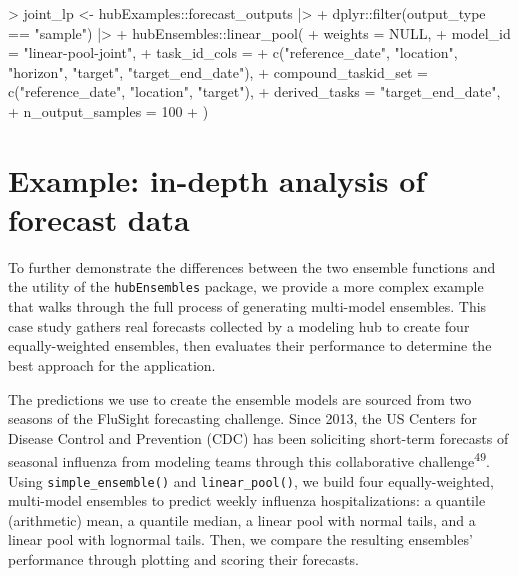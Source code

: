 \documentclass[
  letterpaper,
  DIV=11,
  numbers=noendperiod]{scrartcl}
\newenvironment{Shaded}{\begin{snugshade}}{\end{snugshade}}
\newcommand{\AttributeTok}[1]{\textcolor[rgb]{0.40,0.45,0.13}{#1}}
\newcommand{\ConstantTok}[1]{\textcolor[rgb]{0.56,0.35,0.01}{#1}}
\newcommand{\DecValTok}[1]{\textcolor[rgb]{0.68,0.00,0.00}{#1}}
\newcommand{\FunctionTok}[1]{\textcolor[rgb]{0.28,0.35,0.67}{#1}}
\newcommand{\NormalTok}[1]{\textcolor[rgb]{0.00,0.23,0.31}{#1}}
\newcommand{\OtherTok}[1]{\textcolor[rgb]{0.00,0.23,0.31}{#1}}
\newcommand{\SpecialCharTok}[1]{\textcolor[rgb]{0.37,0.37,0.37}{#1}}
\newcommand{\StringTok}[1]{\textcolor[rgb]{0.13,0.47,0.30}{#1}}
\begin{document}
\begin{Shaded}
\begin{Highlighting}[]
\SpecialCharTok{\textgreater{}}\NormalTok{ joint\_lp }\OtherTok{\textless{}{-}}\NormalTok{ hubExamples}\SpecialCharTok{::}\NormalTok{forecast\_outputs }\SpecialCharTok{|\textgreater{}}
\SpecialCharTok{+}\NormalTok{   dplyr}\SpecialCharTok{::}\FunctionTok{filter}\NormalTok{(output\_type }\SpecialCharTok{==} \StringTok{"sample"}\NormalTok{) }\SpecialCharTok{|\textgreater{}}
\SpecialCharTok{+}\NormalTok{   hubEnsembles}\SpecialCharTok{::}\FunctionTok{linear\_pool}\NormalTok{(}
\SpecialCharTok{+}     \AttributeTok{weights =} \ConstantTok{NULL}\NormalTok{,}
\SpecialCharTok{+}     \AttributeTok{model\_id =} \StringTok{"linear{-}pool{-}joint"}\NormalTok{,}
\SpecialCharTok{+}     \AttributeTok{task\_id\_cols =}
\SpecialCharTok{+}       \FunctionTok{c}\NormalTok{(}\StringTok{"reference\_date"}\NormalTok{, }\StringTok{"location"}\NormalTok{, }\StringTok{"horizon"}\NormalTok{, }\StringTok{"target"}\NormalTok{, }\StringTok{"target\_end\_date"}\NormalTok{),}
\SpecialCharTok{+}     \AttributeTok{compound\_taskid\_set =} \FunctionTok{c}\NormalTok{(}\StringTok{"reference\_date"}\NormalTok{, }\StringTok{"location"}\NormalTok{, }\StringTok{"target"}\NormalTok{),}
\SpecialCharTok{+}     \AttributeTok{derived\_tasks =} \StringTok{"target\_end\_date"}\NormalTok{,}
\SpecialCharTok{+}     \AttributeTok{n\_output\_samples =} \DecValTok{100}
\SpecialCharTok{+}\NormalTok{   )}
\end{Highlighting}
\end{Shaded}

\section{Example: in-depth analysis of forecast
data}\label{sec-case-study}

To further demonstrate the differences between the two ensemble
functions and the utility of the \texttt{hubEnsembles} package, we
provide a more complex example that walks through the full process of
generating multi-model ensembles. This case study gathers real forecasts
collected by a modeling hub to create four equally-weighted ensembles,
then evaluates their performance to determine the best approach for the
application.

The predictions we use to create the ensemble models are sourced from
two seasons of the FluSight forecasting challenge. Since 2013, the US
Centers for Disease Control and Prevention (CDC) has been soliciting
short-term forecasts of seasonal influenza from modeling teams through
this collaborative challenge\textsuperscript{49}. Using
\texttt{simple\_ensemble()} and \texttt{linear\_pool()}, we build four
equally-weighted, multi-model ensembles to predict weekly influenza
hospitalizations: a quantile (arithmetic) mean, a quantile median, a
linear pool with normal tails, and a linear pool with lognormal tails.
Then, we compare the resulting ensembles' performance through plotting
and scoring their forecasts.
\end{document}

